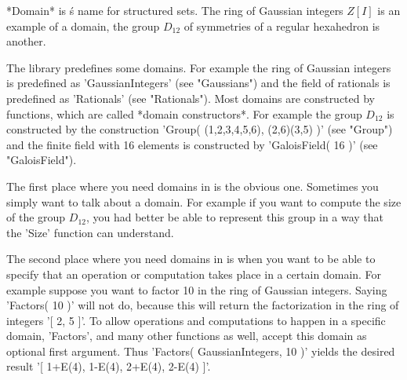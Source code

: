 
*Domain* is {\GAP}\'s  name  for structured sets.   The ring  of Gaussian
integers  $Z[I]$  is  an  example  of  a  domain,  the group  $D_{12}$ of
symmetries of a regular hexahedron is another.

The {\GAP}  library predefines some   domains.  For example  the  ring of
Gaussian integers is  predefined as 'GaussianIntegers' (see  "Gaussians")
and the   field   of rationals   is predefined  as      'Rationals'  (see
"Rationals").   Most domains  are  constructed  by  functions,  which are
called  *domain   constructors*.   For  example  the    group $D_{12}$ is
constructed by the construction 'Group( (1,2,3,4,5,6), (2,6)(3,5) )' (see
"Group") and  the finite  field  with  16  elements   is constructed   by
'GaloisField( 16 )' (see "GaloisField").

The first place where  you need domains  in {\GAP}  is  the  obvious one.
Sometimes you simply want to talk about a  domain.  For  example  if  you
want to compute the size of the group $D_{12}$, you had better be able to
represent this group in a way that the 'Size' function can understand.

The second place where you need domains in {\GAP} is when  you want to be
able to specify that an operation or computation takes place in a certain
domain.   For  example suppose  you want   to factor 10    in the ring of
Gaussian integers.  Saying 'Factors( 10 )' will not do, because this will
return the factorization in  the ring of integers '[  2, 5 ]'.  To  allow
operations and  computations to happen in   a specific domain, 'Factors',
and many other functions  as well, accept  this domain as optional  first
argument.   Thus 'Factors( GaussianIntegers,   10 )'  yields  the desired
result '[ 1+E(4), 1-E(4), 2+E(4), 2-E(4) ]'.


